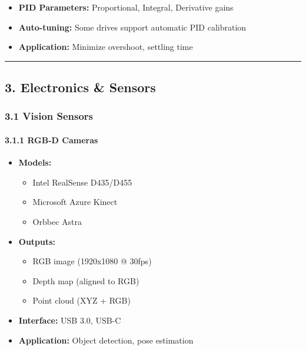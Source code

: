 \documentclass[
]{article}
\providecommand{\tightlist}{%
  \setlength{\itemsep}{0pt}\setlength{\parskip}{0pt}}
\begin{document}
\begin{itemize}
\tightlist
\item
  \textbf{PID Parameters:} Proportional, Integral, Derivative gains
\item
  \textbf{Auto-tuning:} Some drives support automatic PID calibration
\item
  \textbf{Application:} Minimize overshoot, settling time
\end{itemize}

\begin{center}\rule{0.5\linewidth}{0.5pt}\end{center}

\hypertarget{electronics-sensors}{%
\subsection{3. Electronics \& Sensors}\label{electronics-sensors}}

\hypertarget{vision-sensors}{%
\subsubsection{3.1 Vision Sensors}\label{vision-sensors}}

\hypertarget{rgb-d-cameras}{%
\paragraph{3.1.1 RGB-D Cameras}\label{rgb-d-cameras}}

\begin{itemize}
\tightlist
\item
  \textbf{Models:}

  \begin{itemize}
  \tightlist
  \item
    Intel RealSense D435/D455
  \item
    Microsoft Azure Kinect
  \item
    Orbbec Astra
  \end{itemize}
\item
  \textbf{Outputs:}

  \begin{itemize}
  \tightlist
  \item
    RGB image (1920x1080 @ 30fps)
  \item
    Depth map (aligned to RGB)
  \item
    Point cloud (XYZ + RGB)
  \end{itemize}
\item
  \textbf{Interface:} USB 3.0, USB-C
\item
  \textbf{Application:} Object detection, pose estimation
\end{itemize}
\end{document}
